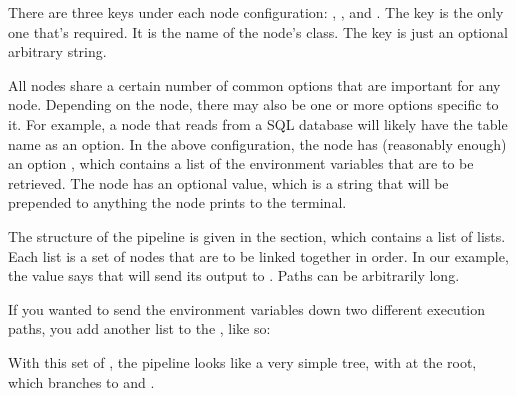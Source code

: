 \documentclass[letterpaper,10pt,english]{sphinxmanual}
\begin{document}
There are three keys under each node configuration: , , and
. The  key is the only one that’s required. It is the name
of the node’s class. The  key is just an optional arbitrary string.

All nodes share a certain number of common options that are important for any
node. Depending on the node, there may also be one or more options specific to
it. For example, a node that reads from a SQL database will likely have the
table name as an option. In the above configuration, the
 node has (reasonably enough) an option
, which contains a list of the environment variables
that are to be retrieved. The  node has an optional
 value, which is a string that will be prepended to anything the
node prints to the terminal.

The structure of the pipeline is given in the  section, which contains
a list of lists. Each list is a set of nodes that are to be linked together in
order. In our example, the  value says that
 will send its output to .
Paths can be arbitrarily long.

If you wanted to send the environment variables down two different execution
paths, you add another list to the , like so:

%
\begin{sphinxVerbatim}[commandchars=\\\{\}]
     
     
     
     
     
\end{sphinxVerbatim}

With this set of , the pipeline looks like a very simple tree, with
 at the root, which branches to
 and .
\end{document}
